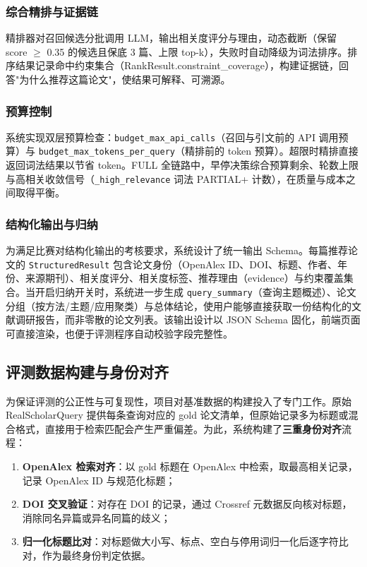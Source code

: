 \documentclass[11pt,a4paper,fontset=macnew]{ctexart}
\begin{document}
\subsubsection{综合精排与证据链}
精排器对召回候选分批调用 LLM，输出相关度评分与理由，动态截断（保留 score $\geq$ 0.35 的候选且保底 3 篇、上限 top-k），失败时自动降级为词法排序。排序结果记录命中约束集合（RankResult.constraint\_coverage），构建证据链，回答"为什么推荐这篇论文"，使结果可解释、可溯源。

\subsubsection{预算控制}
系统实现双层预算检查：\texttt{budget\_max\_api\_calls}（召回与引文前的 API 调用预算）与 \texttt{budget\_max\_tokens\_per\_query}（精排前的 token 预算）。超限时精排直接返回词法结果以节省 token。FULL 全链路中，早停决策综合预算剩余、轮数上限与高相关收敛信号（\texttt{\_high\_relevance} 词法 PARTIAL+ 计数），在质量与成本之间取得平衡。

\subsubsection{结构化输出与归纳}
为满足比赛对结构化输出的考核要求，系统设计了统一输出 Schema。每篇推荐论文的 \texttt{StructuredResult} 包含论文身份（OpenAlex ID、DOI、标题、作者、年份、来源期刊）、相关度评分、相关度标签、推荐理由（evidence）与约束覆盖集合。当开启归纳开关时，系统进一步生成 \texttt{query\_summary}（查询主题概述）、论文分组（按方法/主题/应用聚类）与总体结论，使用户能够直接获取一份结构化的文献调研报告，而非零散的论文列表。该输出设计以 JSON Schema 固化，前端页面可直接渲染，也便于评测程序自动校验字段完整性。

\subsection{评测数据构建与身份对齐}
\label{sec:evaldata}

为保证评测的公正性与可复现性，项目对基准数据的构建投入了专门工作。原始 RealScholarQuery 提供每条查询对应的 gold 论文清单，但原始记录多为标题或混合格式，直接用于检索匹配会产生严重偏差。为此，系统构建了\textbf{三重身份对齐}流程：

\begin{enumerate}
  \item \textbf{OpenAlex 检索对齐}：以 gold 标题在 OpenAlex 中检索，取最高相关记录，记录 OpenAlex ID 与规范化标题；
  \item \textbf{DOI 交叉验证}：对存在 DOI 的记录，通过 Crossref 元数据反向核对标题，消除同名异篇或异名同篇的歧义；
  \item \textbf{归一化标题比对}：对标题做大小写、标点、空白与停用词归一化后逐字符比对，作为最终身份判定依据。
\end{enumerate}
\end{document}
